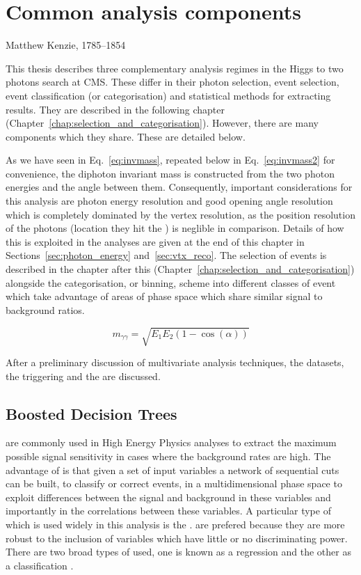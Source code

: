 \chapter{Common analysis components}
\label{chap:common_analysis_components}
{Matthew Kenzie, 1785--1854}

This thesis describes three complementary analysis regimes in the Higgs to two photons search at CMS. These differ in their photon selection, event selection, event classification (or categorisation) and statistical methods for extracting results. They are described in the following chapter (Chapter~\ref{chap:selection_and_categorisation}). However, there are many components which they share. These are detailed below.

As we have seen in Eq.~\ref{eq:invmass}, repeated below in Eq.~\ref{eq:invmass2} for convenience, the diphoton invariant mass is constructed from the two photon energies and the angle between them. Consequently, important considerations for this analysis are photon energy resolution and good opening angle resolution which is completely dominated by the vertex resolution, as the position resolution of the photons (location they hit the \ECAL) is neglible in comparison. Details of how this is exploited in the analyses are given at the end of this chapter in Sections~\ref{sec:photon_energy} and~\ref{sec:vtx_reco}. The selection of events is described in the chapter after this (Chapter~\ref{chap:selection_and_categorisation}) alongside the categorisation, or binning, scheme into different classes of event which take advantage of areas of phase space which share similar signal to background ratios.

\begin{equation}
  m_{\gamma\gamma} = \sqrt{E_{1}E_{2}(1-\cos(\alpha))}
  \label{eq:invmass2}
\end{equation}

After a preliminary discussion of multivariate analysis techniques, the datasets, the triggering and the \MC are discussed.

\section{Boosted Decision Trees}
\label{sec:bdts}

\MVAs are commonly used in High Energy Physics analyses to extract the maximum possible signal sensitivity in cases where the background rates are high. The advantage of \MVAs is that given a set of input variables a network of sequential cuts can be built, to classify or correct events, in a multidimensional phase space to exploit differences between the signal and background in these variables and importantly in the correlations between these variables. A particular type of \MVA which is used widely in this analysis is the \BDT. \BDTs are prefered because they are more robust to the inclusion of variables which have little or no discriminating power. There are two broad types of \BDT used, one is known as a regression \BDT and the other as a classification \BDT. 

